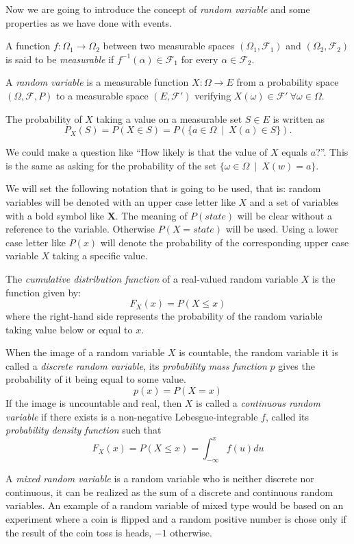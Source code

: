 Now we are going to introduce the concept of \emph{random variable} and some
properties as we have done with events.

\begin{definition}
A function \(f:\Omega_1 \to \Omega_2\) between two
measurable spaces \((\Omega_1, \mathcal{F}_1)\) and \((\Omega_2, \mathcal{F}_2)\) is said to be \emph{measurable} if \(f^{-1}(\alpha) \in \mathcal{F}_1\) for every \(\alpha \in \mathcal{F}_2\).
\end{definition}

\begin{definition}
  A \emph{random variable} is a measurable function \(X:\Omega \to E\) from a probability
  space \((\Omega, \mathcal{F}, P)\) to a measurable space \((E,
  \mathcal{F}')\) verifying \(X(\omega)\in \mathcal{F}' \ \forall \omega \in \Omega\).

The probability of \(X\) taking a value on a measurable set \(S \in E\) is
written as
\[
P_X(S) = P(X \in S) = P(\{a \in \Omega \ \mid  \ X(a) \in S \}).
\]
\end{definition}

We could make a question like ``How likely is that the value of \(X\) equals
\(a\)?''. This is the same as asking for the probability of the set \(\{\omega
\in \Omega \ \mid  \ X(w) = a\}\).

We will set the following notation that is going to be used, that is: random variables will be
denoted with an upper case letter like \(X\) and a set of variables with a
bold symbol like \(\bm{X}\). The meaning of \(P(state)\) will be clear without a reference to the variable.
Otherwise \(P(X = state)\) will be used.
Using a lower case letter like \(P(x)\) will denote the probability of the
corresponding upper case variable \(X\) taking a specific value.

\begin{definition}
The \emph{cumulative distribution function} of a real-valued random variable \(X\) is the
function given by:
\[
F_X (x) = P(X \leq x)
\]
where the right-hand side represents the probability of the random variable
taking value below or equal to \(x\).
\end{definition}

\begin{definition}
When the image of a random variable \(X\) is countable, the random variable it
is called a
\emph{discrete random variable}, its \emph{probability mass function} \(p\) gives the
probability of it being equal to some value.
\[
p(x) = P(X = x)
\]
If the image is uncountable and real, then \(X\) is called a \emph{continuous random
  variable} if there exists is a non-negative
Lebesgue-integrable \(f\), called its \emph{probability density function} such that
\[
F_X(x) = P(X \leq x) = \int_{-\infty}^x f(u) du
\]

A \emph{mixed random variable} is a random variable who is neither discrete nor
continuous, it can be realized as the sum of a discrete and continuous random
variables. An example of a random variable of mixed type would be based on an
experiment where a coin is flipped and a random positive number is chose only if
the result of the coin toss is heads, $-1$ otherwise.
\end{definition}

